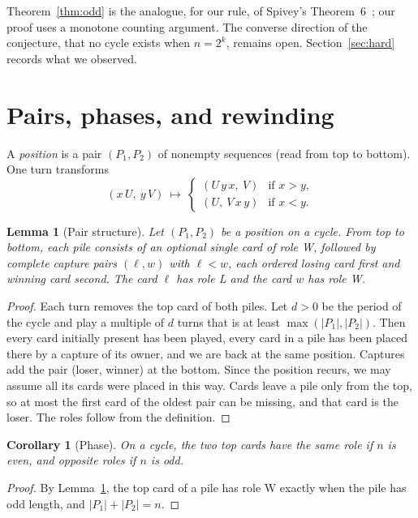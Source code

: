 \documentclass[11pt,a4paper]{amsart}
\newtheorem{lemma}[theorem]{Lemma}
\newtheorem{corollary}[theorem]{Corollary}
\theoremstyle{definition}
\theoremstyle{remark}
\begin{document}
Theorem~\ref{thm:odd} is the analogue, for our rule, of Spivey's Theorem~6~\cite{Spivey}; our proof uses a monotone counting argument. The converse direction of the conjecture, that no cycle exists when $n=2^k$, remains open. Section~\ref{sec:hard} records what we observed.

\section{Pairs, phases, and rewinding}\label{sec:basic}

A \emph{position} is a pair $(P_1,P_2)$ of nonempty sequences (read from top to bottom). One turn transforms
\[
(x\,U,\ y\,V)\ \longmapsto\
\begin{cases}
(U\,y\,x,\ V) & \text{if } x>y,\\
(U,\ V\,x\,y) & \text{if } x<y.
\end{cases}
\]

\begin{lemma}[Pair structure]\label{lem:pairs}
Let $(P_1,P_2)$ be a position on a cycle. From top to bottom, each pile consists of an optional single card of role W, followed by complete capture pairs $(\ell,w)$ with $\ell<w$, each ordered losing card first and winning card second. The card $\ell$ has role L and the card $w$ has role W.
\end{lemma}

\begin{proof}
Each turn removes the top card of both piles. Let $d>0$ be the period of the cycle and play a multiple of $d$ turns that is at least $\max(|P_1|,|P_2|)$. Then every card initially present has been played, every card in a pile has been placed there by a capture of its owner, and we are back at the same position. Captures add the pair (loser, winner) at the bottom. Since the position recurs, we may assume all its cards were placed in this way. Cards leave a pile only from the top, so at most the first card of the oldest pair can be missing, and that card is the loser. The roles follow from the definition.
\end{proof}

\begin{corollary}[Phase]\label{cor:phase}
On a cycle, the two top cards have the same role if $n$ is even, and opposite roles if $n$ is odd.
\end{corollary}

\begin{proof}
By Lemma~\ref{lem:pairs}, the top card of a pile has role W exactly when the pile has odd length, and $|P_1|+|P_2|=n$.
\end{proof}
\end{document}
